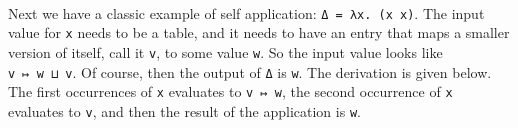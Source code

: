 \begin{fence}
\begin{code}
\AgdaSymbol{(}\AgdaSpace{}%
\AgdaSpace{}%
\AgdaSymbol{)}\<%
\\
%
\\[\AgdaEmptyExtraSkip]%
%
\>[8]\AgdaSpace{}%
\AgdaSymbol{:}\AgdaSpace{}%
\AgdaSpace{}%
\AgdaSpace{}%
\AgdaSpace{}%
\AgdaSpace{}%
\AgdaSpace{}%
\AgdaSpace{}%
\AgdaSpace{}%
\AgdaSpace{}%
\AgdaSpace{}%
\AgdaSpace{}%
\<%
\\
%
\>[8]\AgdaSpace{}%
\AgdaSymbol{=}\AgdaSpace{}%
\AgdaSymbol{(}\AgdaSpace{}%
\AgdaSymbol{(}\AgdaSpace{}%
\AgdaSpace{}%
\AgdaSymbol{))}\<%
\end{code}
\end{fence}

Next we have a classic example of self application:
\texttt{Δ\ =\ λx.\ (x\ x)}. The input value for \texttt{x} needs to be a
table, and it needs to have an entry that maps a smaller version of
itself, call it \texttt{v}, to some value \texttt{w}. So the input value
looks like \texttt{v\ ↦\ w\ ⊔\ v}. Of course, then the output of
\texttt{Δ} is \texttt{w}. The derivation is given below. The first
occurrences of \texttt{x} evaluates to \texttt{v\ ↦\ w}, the second
occurrence of \texttt{x} evaluates to \texttt{v}, and then the result of
the application is \texttt{w}.

